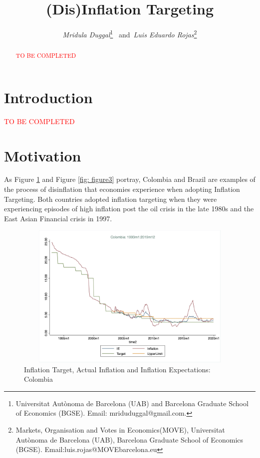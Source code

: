 \documentclass[12pt]{article}
\title{\textbf{(Dis)Inflation Targeting}}
\date{}
\author{\textit{Mridula Duggal}\thanks{Universitat Aut\`onoma de Barcelona (UAB) and Barcelona Graduate School of Economics (BGSE). Email: mriduduggal@gmail.com.} \mbox{ and }\textit{Luis Eduardo Rojas}\thanks{Markets, Organisation and Votes in Economics(MOVE), Universitat Aut\`onoma de Barcelona (UAB), Barcelona Graduate School of Economics (BGSE). Email:luis.rojas@MOVEbarcelona.eu}}
\theoremstyle{definition}
\theoremstyle{plain}
\theoremstyle{plain}
\theoremstyle{remark}
\theoremstyle{plain}
\begin{document}
\begin{titlepage}
\clearpage\maketitle
\thispagestyle{empty}
    \justify
    \begin{abstract}
    \textcolor{red}{TO BE COMPLETED}
    \end{abstract}
\end{titlepage}
\newpage
\section{Introduction}
\textcolor{red}{TO BE COMPLETED}

\section{Motivation}
\justify
As Figure \ref{fig:figure1} and Figure \ref{fig: figure3} portray, Colombia and Brazil are examples of the process of disinflation that economies experience when adopting Inflation Targeting. Both countries adopted inflation targeting when they were experiencing episodes of high inflation post the oil crisis in the late 1980s and the East Asian Financial crisis in 1997. 

\begin{figure}[H]
\centering 
\caption{Inflation Target, Actual Inflation and Inflation Expectations: Colombia} 
\label{fig:figure1}
\includegraphics[width=12cm, height=7cm]{Colombia}
\end{figure}

\end{document}
